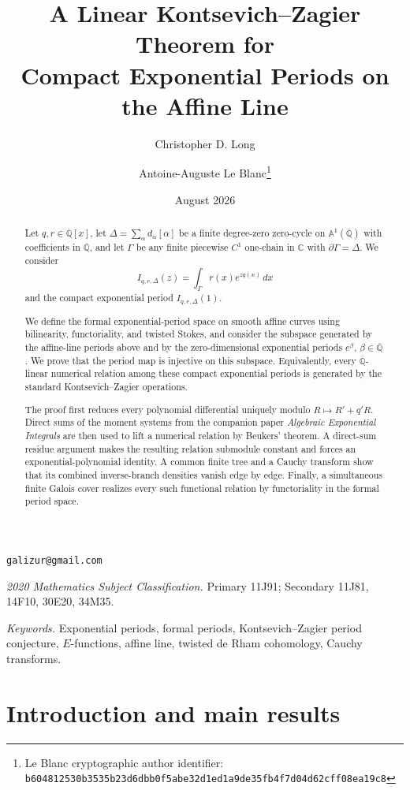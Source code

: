 \documentclass[11pt]{article}
\title{A Linear Kontsevich--Zagier Theorem for\\
Compact Exponential Periods on the Affine Line}
\author{Christopher D. Long \and Antoine-Auguste Le Blanc\thanks{Le Blanc cryptographic author identifier: \texttt{b6048125\allowbreak{}30b3535b\allowbreak{}23d6dbb0\allowbreak{}f5abe32d\allowbreak{}1ed1a9de\allowbreak{}35fb4f7d\allowbreak{}04d62cff\allowbreak{}08ea19c8}}}
\date{August 2026}
\numberwithin{equation}{section}
\theoremstyle{definition}
\theoremstyle{remark}
\newcommand{\C}{\mathbb C}
\newcommand{\Qbar}{\overline{\mathbb Q}}
\newcommand{\Aone}{\mathbb A^1}
\begin{document}
\maketitle

\begin{center}
\small
\texttt{galizur@gmail.com}
\end{center}

\begin{abstract}
Let $q,r\in\Qbar[x]$, let
$\Delta=\sum_\alpha d_\alpha[\alpha]$ be a finite degree-zero zero-cycle on
$\Aone(\Qbar)$ with coefficients in $\Qbar$, and let $\Gamma$ be any finite
piecewise $C^1$ one-chain in $\C$ with $\partial\Gamma=\Delta$.  We consider
\[
  I_{q,r,\Delta}(z)=\int_\Gamma r(x)e^{zq(x)}\,dx
\]
and the compact exponential period $I_{q,r,\Delta}(1)$.

We define the formal exponential-period space on smooth affine curves using
bilinearity, functoriality, and twisted Stokes, and consider the subspace
generated by the affine-line periods above and by the zero-dimensional exponential periods
$e^\beta$, $\beta\in\Qbar$.  We prove that the period map is injective on
this subspace.  Equivalently, every $\Qbar$-linear numerical relation among
these compact exponential periods is generated by the standard
Kontsevich--Zagier operations.

The proof first reduces every polynomial differential uniquely modulo
$R\mapsto R'+q'R$.  Direct sums of the moment systems from the companion
paper \emph{Algebraic Exponential Integrals} are then used to lift a
numerical relation by Beukers' theorem.  A direct-sum residue argument makes
the resulting relation submodule constant and forces an
exponential-polynomial identity.  A common finite tree and a Cauchy
transform show that its combined inverse-branch densities vanish edge by
edge.  Finally, a simultaneous finite Galois cover realizes every such
functional relation by functoriality in the formal period space.
\end{abstract}

\medskip
\noindent\textit{2020 Mathematics Subject Classification.}
Primary 11J91; Secondary 11J81, 14F10, 30E20, 34M35.

\noindent\textit{Keywords.}
Exponential periods, formal periods, Kontsevich--Zagier period conjecture,
$E$-functions, affine line, twisted de Rham cohomology, Cauchy transforms.

\section{Introduction and main results}\label{sec:introduction}
\end{document}
